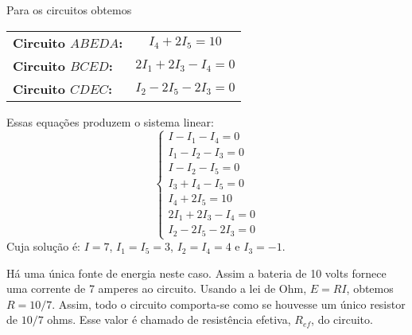 Para os circuitos obtemos
\begin{center}
    \begin{tabular}{lc}
        \textbf{Circuito $ABEDA$:} & $I_4 + 2I_5 = 10$\\
        \textbf{Circuito $BCED$:} & $2I_1 + 2I_3 - I_4 = 0$\\
        \textbf{Circuito $CDEC$:} & $I_2 - 2I_5 - 2I_3 = 0$
    \end{tabular}
\end{center}

Essas equações produzem o sistema linear:
\[
    \begin{cases}
        I - I_1 - I_4 = 0\\
        I_1 - I_2 - I_3 = 0\\
        I - I_2 - I_5 = 0\\
        I_3 + I_4 - I_5 = 0\\
        I_4 + 2I_5 = 10\\
        2I_1 + 2I_3 - I_4 = 0\\
        I_2 - 2I_5 - 2I_3 = 0
    \end{cases}
\]
Cuja solução é: $I = 7$, $I_1 = I_5 = 3$, $I_2 = I_4 = 4$ e $I_3 = -1$.

\begin{observacao}
    Há uma única fonte de energia neste caso. Assim a bateria de 10 volts fornece uma corrente de 7 amperes ao circuito. Usando a lei de Ohm, $E = RI$, obtemos $R = 10/7$. Assim, todo o circuito comporta-se como se houvesse um único resistor de $10/7$ ohms. Esse valor é chamado de \textrm{resistência efetiva}, $R_{ef}$, do circuito.
\end{observacao}